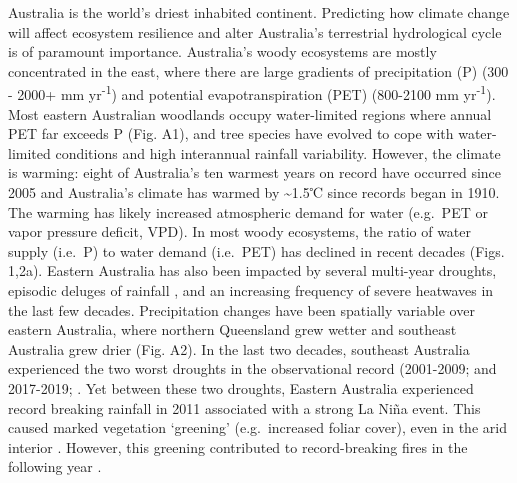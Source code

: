 \documentclass[gc, manuscript]{copernicus}
\begin{document}


\introduction[Introduction]

Australia is the world's driest inhabited continent. Predicting how
climate change will affect ecosystem resilience and alter Australia's
terrestrial hydrological cycle is of paramount importance. Australia's
woody ecosystems are mostly concentrated in the east, where there are
large gradients of precipitation (P) (300 - 2000+ mm
yr\textsuperscript{-1}) and potential evapotranspiration (PET) (800-2100
mm yr\textsuperscript{-1}). Most eastern Australian woodlands occupy
water-limited regions where annual PET far exceeds P (Fig. A1), and tree
species have evolved to cope with water-limited conditions
\citep{petersLivingEdgeContinentalscale2021} and high interannual
rainfall variability. However, the climate is warming: eight of
Australia's ten warmest years on record have occurred since 2005
\citep{csiroStateClimate20202020} and Australia's climate has warmed by
\textasciitilde1.5℃ since records began in 1910. The warming has likely
increased atmospheric demand for water (e.g.~PET or vapor pressure
deficit, VPD). In most woody ecosystems, the ratio of water supply
(i.e.~P) to water demand (i.e.~PET) has declined in recent decades
(Figs. 1,2a). Eastern Australia has also been impacted by several
multi-year droughts, episodic deluges of rainfall
\citep{kingRoleClimateVariability2020b}, and an increasing frequency of
severe heatwaves \citep{perkinsIncreasingFrequencyIntensity2012a} in the
last few decades. Precipitation changes have been spatially variable
over eastern Australia, where northern Queensland grew wetter and
southeast Australia grew drier (Fig. A2). In the last two decades,
southeast Australia experienced the two worst droughts in the
observational record (2001-2009;
\citet{vandijkMillenniumDroughtSoutheast2013d} and 2017-2019;
\citep{bureauofmeteorologyAnnualAustralianClimate}. Yet between these
two droughts, Eastern Australia experienced record breaking rainfall in
2011 associated with a strong La Niña event. This caused marked
vegetation `greening' (e.g.~increased foliar cover), even in the arid
interior
\citep{bastosGlobalNPPDependence2013a, poulterContributionSemiaridEcosystems2014, ahlstromDominantRoleSemiarid2015a}.
However, this greening contributed to record-breaking fires in the
following year \citep{harrisBiologicalResponsesPress2018b}.
\end{document}
